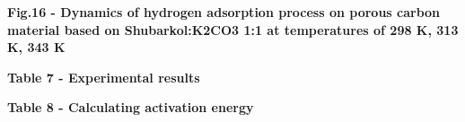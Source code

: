 
{\bfseries Fig.16 - Dynamics of hydrogen adsorption process on porous
carbon material based on Shubarkol:K2CO3 1:1 at temperatures of 298 K,
313 K, 343 K}

{\bfseries Table 7 - Experimental results}


{\bfseries Table 8 - Calculating activation energy}


